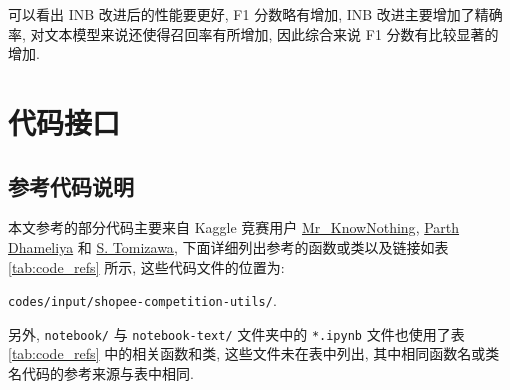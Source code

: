 \documentclass[12pt]{article}
\begin{document}
可以看出 INB 改进后的性能要更好, F1 分数略有增加, INB 改进主要增加了精确率, 对文本模型来说还使得召回率有所增加, 因此综合来说 F1 分数有比较显著的增加.

\section{代码接口}

\subsection{参考代码说明}

本文参考的部分代码主要来自 Kaggle 竞赛用户 \href{https://www.kaggle.com/tanulsingh077}{Mr\_KnowNothing}, \href{https://www.kaggle.com/parthdhameliya77}{Parth Dhameliya} 和 \href{https://www.kaggle.com/shigemitsutomizawa}{S. Tomizawa}, 下面详细列出参考的函数或类以及链接如表 \ref{tab:code_refs} 所示, 这些代码文件的位置为:

\verb|codes/input/shopee-competition-utils/|.

另外, \verb|notebook/| 与 \verb|notebook-text/| 文件夹中的 \verb|*.ipynb| 文件也使用了表 \ref{tab:code_refs} 中的相关函数和类, 这些文件未在表中列出, 其中相同函数名或类名代码的参考来源与表中相同.
\end{document}
